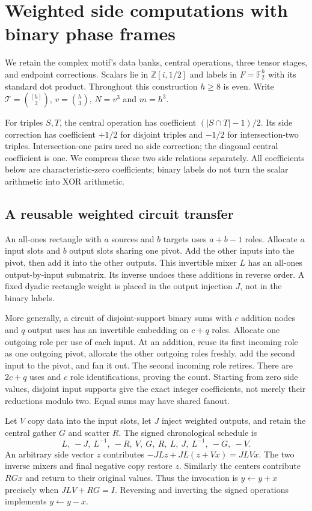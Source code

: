 \section{Weighted side computations with binary phase frames}
\label{sec:complex-compression}
We retain the complex motif's data banks, central operations, three tensor
stages, and endpoint corrections. Scalars lie in $\mathbb Z[i,1/2]$ and
labels in $F=\mathbb F_2^h$ with its standard dot product. Throughout this
construction $h\ge8$ is even. Write $\mathcal T=\binom{[h]}3$,
$v=\binom h3$, $N=v^3$ and $m=h^3$.

For triples $S,T$, the central operation has coefficient
$(|S\cap T|-1)/2$. Its side correction has coefficient $+1/2$ for
disjoint triples and $-1/2$ for intersection-two triples. Intersection-one
pairs need no side correction; the diagonal central coefficient is one.
We compress these two side relations separately. All coefficients below
are characteristic-zero coefficients; binary labels do not turn the scalar
arithmetic into XOR arithmetic.

\subsection{A reusable weighted circuit transfer}
An all-ones rectangle with $a$ sources and $b$ targets uses $a+b-1$ roles.
Allocate $a$ input slots and $b$ output slots sharing one pivot. Add the
other inputs into the pivot, then add it into the other outputs. This
invertible mixer $L$ has an all-ones output-by-input submatrix. Its inverse
undoes these additions in reverse order. A fixed dyadic rectangle weight
is placed in the output injection $J$, not in the binary labels.

More generally, a circuit of disjoint-support binary sums with $c$ addition
nodes and $q$ output uses has an invertible embedding on $c+q$ roles.
Allocate one outgoing role per use of each input. At an addition, reuse
its first incoming role as one outgoing pivot, allocate the other outgoing
roles freshly, add the second input to the pivot, and fan it out. The
second incoming role retires. There are $2c+q$ uses and $c$ role
identifications, proving the count. Starting from zero side values,
disjoint input supports give the exact integer coefficients, not merely
their reductions modulo two. Equal sums may have shared fanout.

Let $V$ copy data into the input slots, let $J$ inject weighted outputs,
and retain the central gather $G$ and scatter $R$. The signed chronological
schedule is
\[
 L,\ -J,\ L^{-1},\ -R,\ V,\ G,\ R,\ L,\ J,\ L^{-1},\ -G,\ -V.
\]
An arbitrary side vector $z$ contributes $-JLz+JL(z+Vx)=JLVx$.
The two inverse mixers and final negative copy restore $z$. Similarly the
centers contribute $RGx$ and return to their original values. Thus the
invocation is $y\gets y+x$ precisely when $JLV+RG=I$. Reversing and
inverting the signed operations implements $y\gets y-x$.

